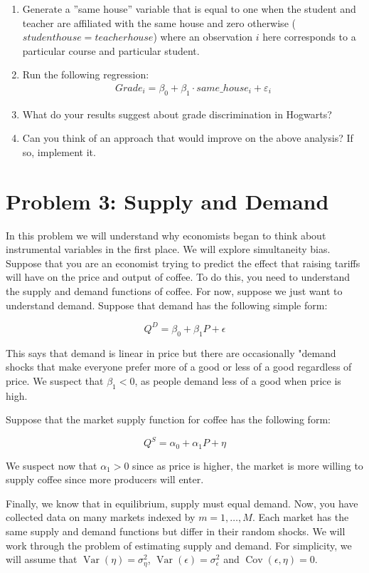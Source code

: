 \documentclass[11pt]{article}
\begin{document}
\begin{enumerate}[label=\alph*.]
\item Generate a ”same house” variable that is equal to one when the student and teacher
are affiliated with the same house and zero otherwise ($student house=teacher house$) 
where an observation $i$ here corresponds to a particular course and particular student.
\item 
Run the following regression:
\begin{align*}
Grade_i = \beta_0+\beta_1 \cdot same\_house_i+\varepsilon_i
\end{align*}

\item What do your results suggest about grade discrimination in Hogwarts?

\item Can you think of an approach that would improve on the above analysis? If so,
implement it.
\end{enumerate}


\section*{\normalsize Problem 3: Supply and Demand}
In this problem we will understand why economists began to think about instrumental variables in the first place. We will explore simultaneity bias. Suppose that you are an economist trying to predict the effect that raising tariffs will have on the price and output of coffee. To do this, you need to understand the supply and demand functions of coffee. For now, suppose we just want to understand demand. Suppose that demand has the following simple form:

$$
Q^D=\beta_0+\beta_1 P+\epsilon
$$


This says that demand is linear in price but there are occasionally "demand shocks that make everyone prefer more of a good or less of a good regardless of price. We suspect that $\beta_1<0$, as people demand less of a good when price is high.

Suppose that the market supply function for coffee has the following form:

$$
Q^S=\alpha_0+\alpha_1 P+\eta
$$


We suspect now that $\alpha_1>0$ since as price is higher, the market is more willing to supply coffee since more producers will enter.

Finally, we know that in equilibrium, supply must equal demand. Now, you have collected data on many markets indexed by $m=1, \ldots, M$. Each market has the same supply and demand functions but differ in their random shocks. We will work through the problem of estimating supply and demand. For simplicity, we will assume that $\operatorname{Var}(\eta)=\sigma_\eta^2$, $\operatorname{Var}(\epsilon)=\sigma_\epsilon^2$ and $\operatorname{Cov}(\epsilon, \eta)=0$.
\end{document}
